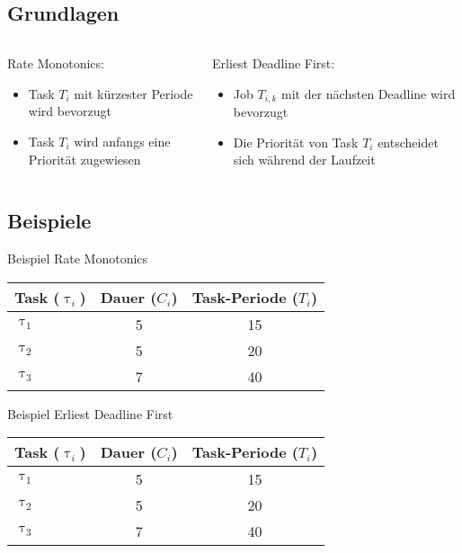 \subsection{Grundlagen}
\begin{frame}{\subsecname}
		\begin{columns}[]
  			\begin{column}{0.5\textwidth}
				Rate Monotonics:
				\begin{itemize}
					\item Task $T_i$ mit kürzester Periode wird bevorzugt
					\item Task $T_i$ wird anfangs eine Priorität zugewiesen
				\end{itemize}

			\end{column}
  			\begin{column}{0.5\textwidth}
  				Erliest Deadline First:
				\begin{itemize}
					\item Job $T_{i, k}$ mit der nächsten Deadline wird bevorzugt
					\item Die Priorität von Task $T_i$ entscheidet sich während der Laufzeit
				\end{itemize}	
  			\end{column}
		\end{columns}
\end{frame}

\subsection{Beispiele}

\newcommand{\showRMSlide}[1] {\begin{frame}{Beispiel Rate Monotonics}
	\begin{center}
		\begin{tabular}{l||c|c}
				Task ($\uptau_i$) & Dauer ($C_i$) & Task-Periode ($T_i$)\\\hline\hline
				$\uptau_1$ & 5 & 15\\
				$\uptau_2$ & 5 & 20\\
				$\uptau_3$ & 7 & 40\\
		\end{tabular}
	\end{center}
	
\end{frame}}

%
{%
	\showRMSlide{\arabic{ct}}
}

\newcommand{\showEDFSlide}[1] {\begin{frame}{Beispiel Erliest Deadline First}
	\begin{center}
		\begin{tabular}{l||c|c}
				Task ($\uptau_i$) & Dauer ($C_i$) & Task-Periode ($T_i$)\\\hline\hline
				$\uptau_1$ & 5 & 15\\
				$\uptau_2$ & 5 & 20\\
				$\uptau_3$ & 7 & 40\\
		\end{tabular}
	\end{center}
	
\end{frame}}

%
{%
	\showEDFSlide{\arabic{ct}}
}